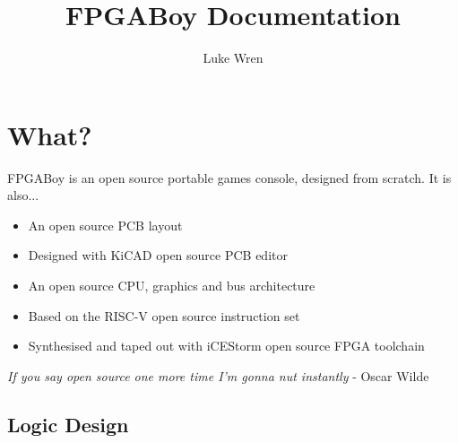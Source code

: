 \documentclass{article}
\title{FPGABoy Documentation}
\author{Luke Wren}
\begin{document}
\maketitle
\tableofcontents
\newpage
{}

\section{What?}

FPGABoy is an open source portable games console, designed from scratch. It is also...
\begin{itemize}
\item An open source PCB layout
\item Designed with KiCAD open source PCB editor
\item An open source CPU, graphics and bus architecture
\item Based on the RISC-V open source instruction set
\item Synthesised and taped out with iCEStorm open source FPGA toolchain
\end{itemize}

\begin{displayquote}
\textit{If you say open source one more time I'm gonna nut instantly} - Oscar Wilde
\end{displayquote}

\subsection{Logic Design}
\end{document}
